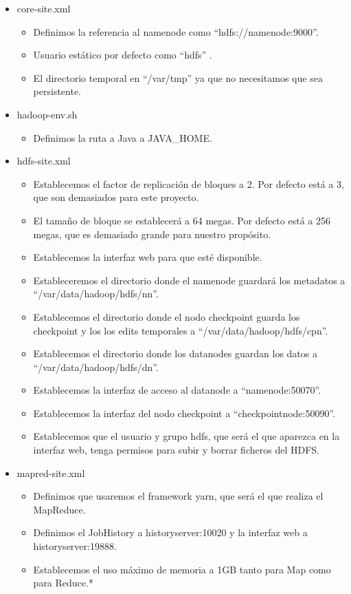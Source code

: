 \begin{itemize}
	\item core-site.xml
	\begin{itemize}
		\item Definimos la referencia al namenode como “hdfs://namenode:9000”.
		\item Usuario estático por defecto como “hdfs” .
		\item El directorio temporal en “/var/tmp” ya que no necesitamos que sea persistente.
	\end{itemize}
	
	\item hadoop-env.sh
	\begin{itemize}
		\item Definimos la ruta a Java a JAVA\_HOME.
	\end{itemize}
	
	\item hdfs-site.xml
	\begin{itemize}
		\item Establecemos el factor de replicación de bloques a 2. Por defecto está a 3, que son demasiados para este proyecto.
		\item El tamaño de bloque se establecerá a 64 megas. Por defecto está a 256 megas, que es demasiado grande para nuestro propósito.
		\item Establecemos la interfaz web para que esté disponible.
		\item Estableceremos el directorio donde el namenode guardará los metadatos a “/var/data/hadoop/hdfs/nn”.
		\item Establecemos el directorio donde el nodo checkpoint guarda los checkpoint y los los edits temporales a “/var/data/hadoop/hdfs/cpn”.
		\item Establecemos el directorio donde los datanodes guardan los datos a “/var/data/hadoop/hdfs/dn”.
		\item Establecemos la interfaz de acceso al datanode a “namenode:50070”.
		\item Establecemos la interfaz del nodo checkpoint a “checkpointnode:50090”.
		\item Establecemos que el usuario y grupo hdfs, que será el que aparezca en la interfaz web, tenga permisos para subir y borrar ficheros del HDFS.
	\end{itemize}
	
	\item mapred-site.xml
	\begin{itemize}
		\item Definimos que usaremos el framework yarn, que será el que realiza el MapReduce.
		\item Definimos el JobHistory a historyserver:10020 y la interfaz web a historyserver:19888.
		\item Establecemos el uso máximo de memoria a 1GB tanto para Map como para Reduce.*
	\end{itemize}
	

\end{itemize}
